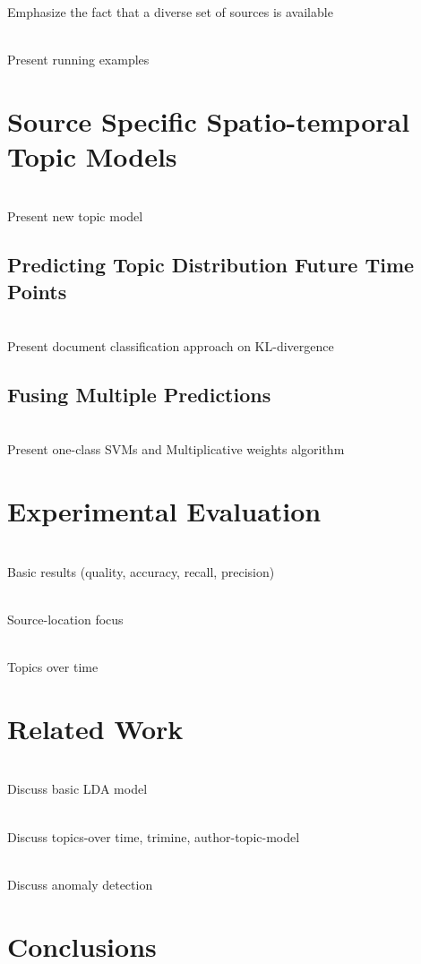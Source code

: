 \documentclass{sig-alternate}
\begin{document}
\ \\Emphasize the fact that a diverse set of sources is available

\ \\Present running examples

\section{Source Specific Spatio-temporal \\Topic Models}
\label{sec:model}

\ \\Present new topic model

\subsection{Predicting Topic Distribution Future Time Points}
\label{sec:pred}

\ \\Present document classification approach on KL-divergence

\subsection{Fusing Multiple Predictions}
\label{sec:integration}

\ \\Present one-class SVMs and Multiplicative weights algorithm

\section{Experimental Evaluation}
\label{sec:exp}

\ \\Basic results (quality, accuracy, recall, precision)

\ \\Source-location focus

\ \\Topics over time

\section{Related Work}
\label{sec:related_work}

\ \\Discuss basic LDA model

\ \\Discuss topics-over time, trimine, author-topic-model

\ \\Discuss anomaly detection


\section{Conclusions}
\label{sec:conclusion}



\end{document}

